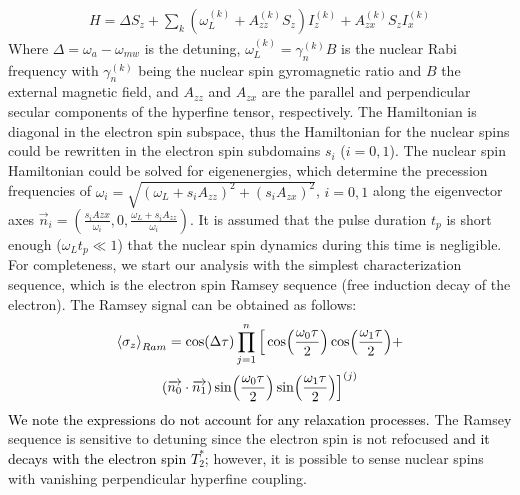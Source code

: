 \documentclass[%
 reprint,
superscriptaddress,
 amsmath,amssymb,
 aps,
]{revtex4-2}
\renewcommand{\vec}[1]{\overrightarrow{#1}}
\begin{document}
\begin{align}
	H = \Delta S_z + \sum_k (\omega_L^{(k)}  + A_{zz}^{(k)} S_z) I_z^{(k)} + A_{zx}^{(k)} S_z I_x^{(k)}
	\label{eq:H}
\end{align}
Where $\Delta = \omega_a - \omega_{mw}$ is the detuning, $\omega_L^{(k)} =\gamma_n^{(k)} B$ is the nuclear Rabi frequency with $\gamma_n^{(k)}$ being the nuclear spin gyromagnetic ratio and $B$ the external magnetic field, and $A_{zz}$ and $A_{zx}$ are the parallel and perpendicular secular components of the hyperfine tensor, respectively.
The Hamiltonian is diagonal in the electron spin subspace, thus the Hamiltonian for the nuclear spins could be rewritten in the electron spin subdomains $s_i$ ($i=0,1$).
The nuclear spin Hamiltonian could be solved for eigenenergies, which determine the precession frequencies of $\omega_i = \sqrt{(\omega_L + s_i A_{zz})^2+ (s_i A_{zx})^2}$, $i=0,1$ along the eigenvector axes $\vec{n}_i =(\frac{s_i A{zx}}{\omega_i}, 0, \frac{\omega_L + s_i A_{zz}} {\omega_i})$.
It is assumed that the pulse duration $t_p$ is short enough ($\omega_L t_p \ll 1$) that the nuclear spin dynamics during this time is negligible.
For completeness, we start our analysis with the simplest characterization sequence, which is the electron spin Ramsey sequence (free induction decay of the electron).
The Ramsey signal can be obtained as follows:
\begin{gather}
	\expval{\sigma_z}_{Ram} = \cos(\Delta \tau) \prod_{j=1}^{n} \Big[ \cos(\frac{\omega_0 \tau}{2}) \cos(\frac{\omega_1 \tau}{2})+ \notag \\
	(\vec{n_0}\cdot \vec{n_1})\sin(\frac{\omega_0 \tau}{2}) \sin(\frac{\omega_1 \tau}{2}) \Big]^{(j)}
\end{gather}	
 \textcolor{black}{We note the expressions do not account for any relaxation processes.} The Ramsey sequence is sensitive to detuning since the electron spin is not refocused \textcolor{black}{and it decays with the electron spin $T_2^\ast$}; however, it is possible to sense nuclear spins with vanishing perpendicular hyperfine coupling.\\
\end{document}
